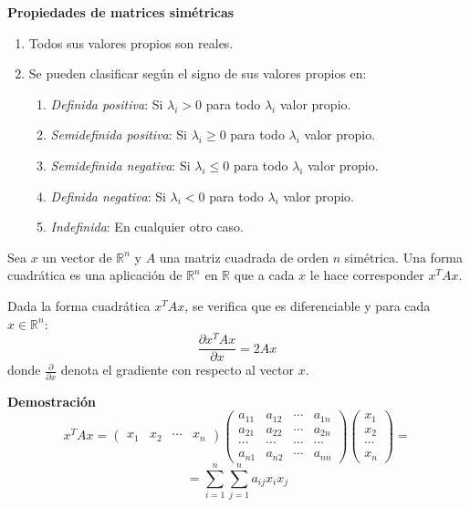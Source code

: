 \textbf{Propiedades de matrices simétricas}
\begin{enumerate}
\item Todos sus valores propios son reales.
\item Se pueden clasificar según el signo de sus valores propios en:
\begin{enumerate}
\item \textit{Definida positiva}: Si $\lambda_i > 0$ para todo $\lambda_i$ valor propio.
\item \textit{Semidefinida positiva}: Si $\lambda_i \geq 0$ para todo $\lambda_i$ valor propio.
\item \textit{Semidefinida negativa}: Si $\lambda_i \leq 0$ para todo $\lambda_i$ valor propio.
\item \textit{Definida negativa}: Si $\lambda_i < 0$ para todo $\lambda_i$ valor propio.
\item \textit{Indefinida}: En cualquier otro caso.
\end{enumerate}
\end{enumerate}

\begin{definicion}
Sea $x$ un vector de $\mathbb{R}^n$ y $A$ una matriz cuadrada de orden $n$ simétrica. Una forma cuadrática es una aplicación de $\mathbb{R}^n$ en $\mathbb{R}$ que a cada $x$ le hace corresponder $x^TAx$.
\end{definicion}

\begin{proposicion}
Dada la forma cuadrática $x^TAx$, se verifica que es diferenciable y para cada $x \in \mathbb{R}^n$:
\[	\frac{\partial x^TAx}{\partial x} = 2Ax	\]
donde $\frac{\partial}{\partial x}$ denota el gradiente con respecto al vector $x$.
\end{proposicion}
\textbf{Demostración}\\
\[	x^TAx = \left( \begin{array}{cccc}
x_1 & x_2 & \cdots & x_n  \end{array} \right)
\left( \begin{array}{cccc}
a_{11} & a_{12} & \cdots & a_{1n} \\
a_{21} & a_{22} & \cdots & a_{2n} \\
\cdots & \cdots & \cdots & \cdots \\
a_{n1} & a_{n2} & \cdots & a_{nn} \end{array} \right)
\left( \begin{array}{c}
x_1 \\
x_2 \\
\cdots \\
x_n \end{array} \right) =
\]
\[ = \sum_{i=1}^n \sum_{j=1}^n a_{ij}x_ix_j	\]

